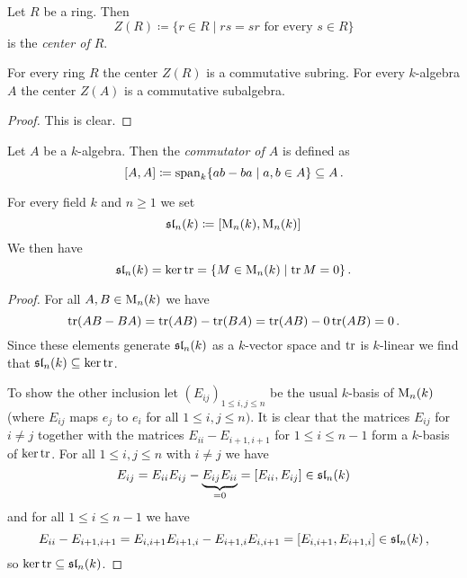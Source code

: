 \begin{defi}
  Let $R$ be a ring. Then
  \[
              Z(R)
    \coloneqq \{
                r \in R
              \mid
                rs = sr
                \text{ for every }
                s \in R
              \}
  \]
  is the \emph{center of $R$}.
\end{defi}


\begin{lem}
  For every ring $R$ the center $Z(R)$ is a commutative subring.
  For every $k$-algebra $A$ the center $Z(A)$ is a commutative subalgebra.
\end{lem}
\begin{proof}
  This is clear.
\end{proof}


\begin{defi}
  Let $A$ be a $k$-algebra.
  Then the \emph{commutator of $A$} is defined as
  \[
              [A,A]
    \coloneqq \operatorname{span}_k  \{
                          ab - ba
                        \mid
                          a, b \in A
                        \}
    \subseteq A \,.
  \]
\end{defi}


\begin{expl}
  For every field $k$ and $n \geq 1$ we set
  \[
    \operatorname{\mathfrak{sl}}_n(k) \coloneqq [\operatorname{M}_n(k), \operatorname{M}_n(k)]
  \]
  We then have
  \[
      \operatorname{\mathfrak{sl}}_n(k)
    = \ker \operatorname{tr}
    = \{
        M \in \operatorname{M}_n(k)
      \mid
        \operatorname{tr} M = 0
      \} \,.
  \]
  \begin{proof}
    For all $A, B \in \operatorname{M}_n(k)$ we have
    \[
        \operatorname{tr}(AB - BA)
      = \operatorname{tr}(AB) - \operatorname{tr}(BA)
      = \operatorname{tr}(AB) -0\operatorname{tr}(AB)
      = 0 \,.
    \]
    Since these elements generate $\operatorname{\mathfrak{sl}}_n(k)$ as a $k$-vector space and $\operatorname{tr}$ is $k$-linear we find that $\operatorname{\mathfrak{sl}}_n(k) \subseteq \ker \operatorname{tr}$.
    
    To show the other inclusion let $(E_{ij})_{1 \leq i,j \leq n}$ be the usual $k$-basis of $\operatorname{M}_n(k)$ (where $E_{ij}$ maps $e_j$ to $e_i$ for all $1 \leq i,j \leq n)$.
    It is clear that the matrices $E_{ij}$ for $i \neq j$ together with the matrices $E_{ii}-E_{i+1,i+1}$ for $1 \leq i \leq n-1$ form a $k$-basis of $\ker \operatorname{tr}$.
    For all $1 \leq i,j \leq n$ with $i \neq j$ we have
    \[
          E_{ij}
      =   E_{ii} E_{ij} - \underbrace{E_{ij} E_{ii}}_{=0}
      =   [E_{ii}, E_{ij}]
      \in \operatorname{\mathfrak{sl}}_n(k)
    \]
    and for all $1 \leq i \leq n-1$ we have
    \[
          E_{ii} - E_{i+1,i+1}
      =   E_{i,i+1} E_{i+1,i} - E_{i+1,i} E_{i,i+1}
      =   [E_{i,i+1}, E_{i+1,i}]
      \in \operatorname{\mathfrak{sl}}_n(k) \,,
    \]
    so $\ker \operatorname{tr} \subseteq \operatorname{\mathfrak{sl}}_n(k)$.
  \end{proof}
\end{expl}


